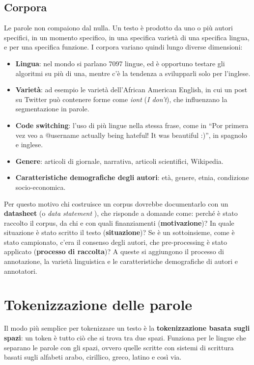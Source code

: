 \subsection{Corpora}
Le parole non compaiono dal nulla. Un testo è prodotto da uno o più autori specifici, in un momento specifico, in una specifica varietà di una specifica lingua, e per una specifica funzione. I corpora variano quindi lungo diverse dimensioni:
\begin{itemize}
    \item \textbf{Lingua}: nel mondo si parlano 7097 lingue, ed è opportuno testare gli algoritmi su più di una, mentre c'è la tendenza a svilupparli solo per l'inglese.
    \item \textbf{Varietà}: ad esempio le varietà dell'African American English, in cui un post su Twitter può contenere forme come \textit{iont} (\textit{I don't}), che influenzano la segmentazione in parole.
    \item \textbf{Code switching}: l'uso di più lingue nella stessa frase, come in \enquote{Por primera vez veo a @username actually being hateful! It was beautiful :)}, in spagnolo e inglese.
    \item \textbf{Genere}: articoli di giornale, narrativa, articoli scientifici, Wikipedia.
    \item \textbf{Caratteristiche demografiche degli autori}: età, genere, etnia, condizione socio-economica.
\end{itemize}

Per questo motivo chi costruisce un corpus dovrebbe documentarlo con un \textbf{datasheet} \cite{gebru2020datasheets} (o \textit{data statement} \cite{bender2018datastatements}), che risponde a domande come: perché è stato raccolto il corpus, da chi e con quali finanziamenti (\textbf{motivazione})? In quale situazione è stato scritto il testo (\textbf{situazione})? Se è un sottoinsieme, come è stato campionato, c'era il consenso degli autori, che pre-processing è stato applicato (\textbf{processo di raccolta})? A queste si aggiungono il processo di annotazione, la varietà linguistica e le caratteristiche demografiche di autori e annotatori.

\section{Tokenizzazione delle parole}
Il modo più semplice per tokenizzare un testo è la \textbf{tokenizzazione basata sugli spazi}: un token è tutto ciò che si trova tra due spazi. Funziona per le lingue che separano le parole con gli spazi, ovvero quelle scritte con sistemi di scrittura basati sugli alfabeti arabo, cirillico, greco, latino e così via.

